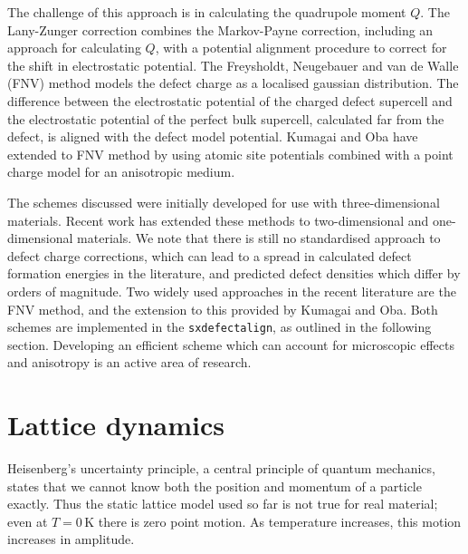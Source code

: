 The challenge of this approach is in calculating the quadrupole moment $Q$. 
The Lany-Zunger correction\cite{Lany2009} combines the Markov-Payne correction, including an approach for calculating $Q$, with a potential alignment procedure to correct for the shift in electrostatic potential. 
The Freysholdt, Neugebauer and van de Walle (FNV) method\cite{Freysoldt2009} models the defect charge as a localised gaussian distribution. 
The difference between the electrostatic potential of the charged defect supercell and the electrostatic potential of the perfect bulk supercell, calculated far from the defect, is aligned with the defect model potential. 
Kumagai and Oba have extended to FNV method by using atomic site potentials combined with a point charge model for an anisotropic medium.\cite{Kumagai2014} 

The schemes discussed were initially developed for use with three-dimensional materials. 
Recent work has extended these methods to two-dimensional\cite{Freysoldt2018,Komsa2013} and one-dimensional\cite{Kim2014} materials.
We note that there is still no standardised approach to defect charge corrections, 
which can lead to a spread in calculated defect formation energies in the literature, and predicted defect densities which differ by orders of magnitude.
Two widely used approaches in the recent literature are the FNV method, and the extension to this provided by Kumagai and Oba.
Both schemes are implemented in the \texttt{sxdefectalign}, as outlined in the following section.
Developing an efficient scheme which can account for microscopic effects and anisotropy is an active area of research.\cite{durrant2018,Vinichenko2017}


\section{Lattice dynamics} \label{sec:latticedynamics}

Heisenberg's uncertainty principle, a central principle of quantum mechanics, states that we cannot know both the position and momentum of a particle exactly. Thus the static lattice model used so far is not true for real material; even at $T=0\,\textrm{K}$ there is zero point motion. As temperature increases, this motion increases in amplitude.

